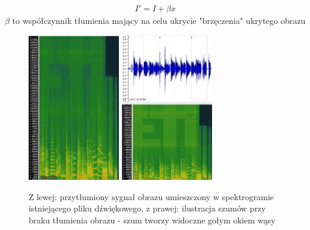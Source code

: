 \documentclass{article}
\begin{document}
\begin{gather*}
I' = I + \beta x
\end{gather*}
$\beta$ to współczynnik tłumienia mający na celu ukrycie "brzęczenia" ukrytego obrazu
\begin{figure}[H]
	\centering
	\includegraphics[width=4cm]{gorszajakosc_spektro}
	\includegraphics[width=4cm]{szumy_spektro}
	\caption{Z lewej: przytłumiony sygnał obrazu umieszczony w spektrogramie istniejącego pliku dźwiękowego, z prawej: ilustracja szumów przy braku tłumienia obrazu - szum tworzy widoczne gołym okiem wąsy}
\end{figure}
\end{document}
